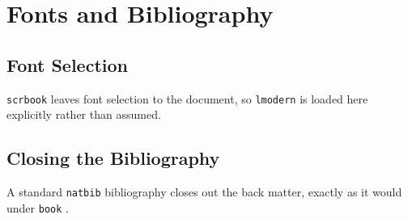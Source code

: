 \documentclass[11pt,twoside]{scrbook}
\begin{document}
\chapter{Fonts and Bibliography}

\section{Font Selection}

\texttt{scrbook} leaves font selection to the document, so \texttt{lmodern}
is loaded here explicitly rather than assumed.

\section{Closing the Bibliography}

A standard \texttt{natbib} bibliography closes out the back matter, exactly
as it would under \texttt{book} \citep{knuth1984texbook}.



\end{document}
